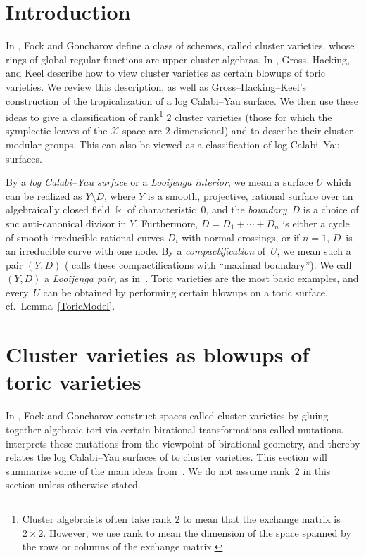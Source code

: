 \documentclass[11pt]{article}
\numberwithin{equation}{section}
\numberwithin{figure}{section}
\numberwithin{table}{section}
\let\s=\mathcal
\newcommand {\kk} {\Bbbk}
\theoremstyle{definition}
\begin{document}
\section{Introduction}\label{Introduction}

In \cite{FG1}, Fock and Goncharov define a class of schemes, called cluster varieties, whose rings of global regular functions are upper cluster algebras. In \cite{GHK3}, Gross, Hacking, and Keel describe how to view cluster varieties as certain blowups of toric varieties. We review this description, as well as Gross--Hacking--Keel's construction \cite{GHK1} of the tropicalization of a log Calabi--Yau surface. We then use these ideas to give a classification of rank\footnote{Cluster algebraists often take rank $2$ to mean that the exchange matrix is $2\times 2$. However, we use rank to mean the dimension of the space spanned by the rows or columns of the exchange matrix.} $2$ cluster varieties (those for which the symplectic leaves of the $\s{X}$-space are $2$ dimensional) and to describe their cluster modular groups. This can also be viewed as a classification of log Calabi--Yau surfaces.

By a {\it log Calabi--Yau surface} or a {\it Looijenga interior}, we mean a surface $U$ which can be realized as $Y\setminus D$, where $Y$ is a smooth, projective, rational surface over an algebraically closed field $\kk$ of characteristic~$0$, and the {\it boundary}~$D$ is a choice of snc anti-canonical divisor in $Y$. Furthermore, $D=D_1+\cdots + D_n$ is either a cycle of smooth irreducible rational curves $D_i$ with normal crossings, or if $n=1$, $D$~is an irreducible curve with one node. By a {\it compactification} of~$U$, we mean such a pair $(Y,D)$ (\cite{GHK2} calls these compactifications with ``maximal boundary''). We call $(Y,D)$ a {\it Looijenga pair}, as in~\cite{GHK1}. Toric varieties are the most basic examples, and every~$U$ can be obtained by performing certain blowups on a toric surface, cf.\ Lemma~\ref{ToricModel}.


\setcounter{section}{1}
\setcounter{subsection}{1}
\setcounter{subsubsection}{0}
\setcounter{thm}{0}
\setcounter{equation}{0}
\section{Cluster varieties as blowups of toric varieties} \label{cluster}

In \cite{FG1}, Fock and Goncharov construct spaces called cluster varieties by gluing together algebraic tori via certain birational transformations called mutations. \cite{GHK3} interprets these mutations from the viewpoint of birational geometry, and thereby relates the log Calabi--Yau surfaces of \cite{GHK1} to cluster varieties. This section will summarize some of the main ideas from~\cite{GHK3}. We do not assume rank~$2$ in this section unless otherwise stated.
\end{document}
